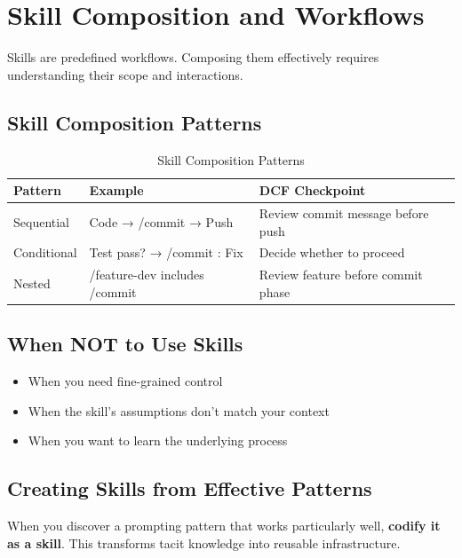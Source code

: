 \chapter{Skill Composition and Workflows}

Skills are predefined workflows. Composing them effectively requires understanding their scope and interactions.

\section{Skill Composition Patterns}

\begin{table}[H]
\centering
\begin{tabular}{lll}
\toprule
\textbf{Pattern} & \textbf{Example} & \textbf{DCF Checkpoint} \\
\midrule
Sequential & Code → /commit → Push & Review commit message before push \\
Conditional & Test pass? → /commit : Fix & Decide whether to proceed \\
Nested & /feature-dev includes /commit & Review feature before commit phase \\
\bottomrule
\end{tabular}
\caption{Skill Composition Patterns}
\end{table}

\section{When NOT to Use Skills}

\begin{itemize}
    \item When you need fine-grained control
    \item When the skill's assumptions don't match your context
    \item When you want to learn the underlying process
\end{itemize}

\section{Creating Skills from Effective Patterns}\label{sec:pattern-to-skill}

When you discover a prompting pattern that works particularly well, \textbf{codify it as a skill}. This transforms tacit knowledge into reusable infrastructure.

